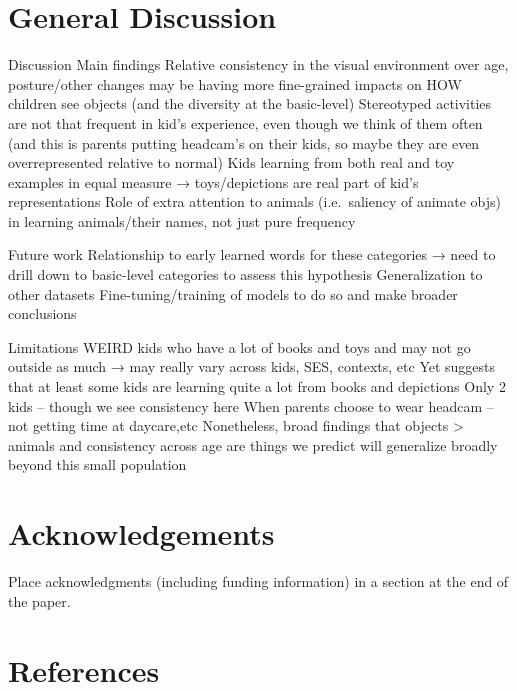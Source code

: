 \documentclass[10pt, letterpaper]{article}
\begin{document}
\hypertarget{general-discussion}{%
\section{General Discussion}\label{general-discussion}}

Discussion Main findings Relative consistency in the visual environment
over age, posture/other changes may be having more fine-grained impacts
on HOW children see objects (and the diversity at the basic-level)
Stereotyped activities are not that frequent in kid's experience, even
though we think of them often (and this is parents putting headcam's on
their kids, so maybe they are even overrepresented relative to normal)
Kids learning from both real and toy examples in equal measure →
toys/depictions are real part of kid's representations Role of extra
attention to animals (i.e.~saliency of animate objs) in learning
animals/their names, not just pure frequency

Future work Relationship to early learned words for these categories →
need to drill down to basic-level categories to assess this hypothesis
Generalization to other datasets Fine-tuning/training of models to do so
and make broader conclusions

Limitations WEIRD kids who have a lot of books and toys and may not go
outside as much → may really vary across kids, SES, contexts, etc Yet
suggests that at least some kids are learning quite a lot from books and
depictions Only 2 kids -- though we see consistency here When parents
choose to wear headcam -- not getting time at daycare,etc Nonetheless,
broad findings that objects \textgreater{} animals and consistency
across age are things we predict will generalize broadly beyond this
small population

\hypertarget{acknowledgements}{%
\section{Acknowledgements}\label{acknowledgements}}

Place acknowledgments (including funding information) in a section at
the end of the paper.

\hypertarget{references}{%
\section{References}\label{references}}

\setlength{\parindent}{-0.1in} 
\setlength{\leftskip}{0.125in}
\end{document}
